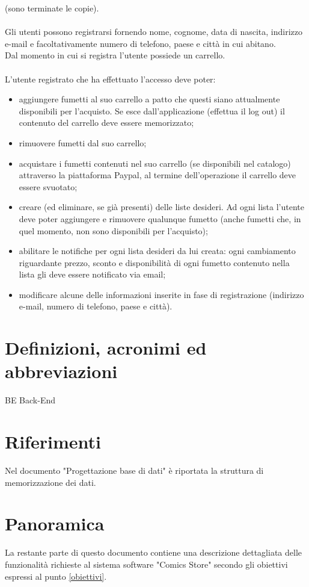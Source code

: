 \documentclass{scrreprt}
\begin{document}
(sono terminate le copie).\\
\\
Gli utenti possono registrarsi fornendo nome, cognome, data di nascita, indirizzo e-mail e
facoltativamente numero di telefono, paese e città in cui abitano.\\
Dal momento in cui si registra l’utente possiede un carrello.\\
\\
L'utente registrato che ha effettuato l'accesso deve poter:
\begin{itemize}
    \item aggiungere fumetti al suo carrello a patto che questi siano attualmente disponibili per 
    l’acquisto. Se esce dall’applicazione (effettua il log out) il contenuto del carrello deve
    essere memorizzato;
    \item rimuovere fumetti dal suo carrello;
    \item acquistare i fumetti contenuti nel suo carrello (se disponibili nel catalogo) attraverso
    la piattaforma Paypal, al termine dell’operazione il carrello deve essere svuotato;
    \item creare (ed eliminare, se già presenti) delle liste desideri. Ad ogni lista l’utente deve
    poter aggiungere e rimuovere qualunque fumetto (anche fumetti che, in quel momento, non sono 
    disponibili per l’acquisto);
    \item abilitare le notifiche per ogni lista desideri da lui creata: ogni cambiamento 
    riguardante prezzo, sconto e disponibilità di ogni fumetto contenuto nella lista gli deve essere
    notificato via email;
    \item modificare alcune delle informazioni inserite in fase di registrazione (indirizzo e-mail,
    numero di telefono, paese e città).
\end{itemize}

\section{Definizioni, acronimi ed abbreviazioni}
BE Back-End

\section{Riferimenti}
Nel documento "Progettazione base di dati" è riportata la struttura di memorizzazione dei dati.

\section{Panoramica}
La restante parte di questo documento contiene una descrizione dettagliata delle funzionalità richieste
al sistema software "Comics Store" secondo gli obiettivi espressi al punto \ref*{obiettivi}.
\end{document}
